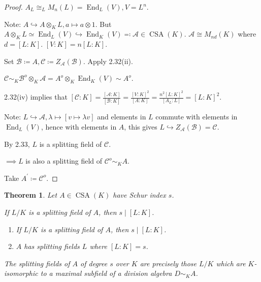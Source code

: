 \documentclass{article}
\theoremstyle{definition}
\theoremstyle{plain}
\newtheorem{theorem}{Theorem}[section]
\theoremstyle{remark}
\begin{document}
    \begin{proof}
        \(A_L \cong_L M_n(L) = \operatorname{End}_L(V), V = L^n\).

        Note: \(A \hookrightarrow A \otimes_K L, a \mapsto a \otimes 1\). But \(A \otimes_K L \simeq \operatorname{End}_L(V) \hookrightarrow \operatorname{End}_K(V) \eqqcolon \mathscr{A} \in \operatorname{CSA}(K)\). \(\mathscr{A} \cong M_{nd}(K)\) where \(d = [L:K]\). \([V:K] = n[L:K]\).

        Set \(\mathscr{B} \coloneqq A, \mathscr{C} \coloneqq Z_{\mathscr{A}} (\mathscr{B})\). Apply 2.32(ii).

        \(\mathscr{C} \sim_K \mathscr{B}^o \otimes_K \mathscr{A} = A^o \otimes_K \operatorname{End}_K(V) \sim A^o\).

        2.32(iv) implies that \([\mathscr{C} : K] = \frac{[\mathscr{A} : K]}{[\mathscr{B} : K]} = \frac{[V:K]^2}{[A:K]} = \frac{n^2 [L:K]^2}{[A_L : L]} = [L:K]^2\). 

        Note: \(L \hookrightarrow \mathscr{A}, \lambda \mapsto [v \mapsto \lambda v]\) and elements in \(L\) commute with elements in \(\operatorname{End}_L(V)\), hence with elements in \(A\), this gives \(L \hookrightarrow Z_{\mathscr{A}}(\mathscr{B}) = \mathscr{C}\).

        By 2.33, \(L\) is a splitting field of \(\mathscr{C}\).

        \(\implies L\) is also a splitting field of \(\mathscr{C}^o \sim_K A\).

        Take \(A^{\prime} \coloneqq \mathscr{C}^o\).
    \end{proof}

    \begin{theorem}
        Let \(A \in \operatorname{CSA} (K)\) have Schur index \(s\).

        If \(L / K\) is a splitting field of \(A\), then \(s \mid [L:K]\).

        \begin{enumerate}[label=\roman*)]
            \item If \(L / K\) is a splitting field of \(A\), then \(s \mid [L:K]\).
            \item \(A\) has splitting fields \(L\) where \([L:K] = s\).
        \end{enumerate} 

         The splitting fields of \(A\) of degree \(s\) over \(K\) are precisely those \(L / K\) which are \(K\)-isomorphic to a maximal subfield of a division algebra \(D \sim_K A\).
        
    \end{theorem}
\end{document}

